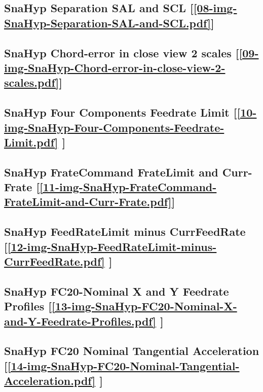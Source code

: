 \subsection       {SnaHyp Separation SAL and SCL
	[\ref      {08-img-SnaHyp-Separation-SAL-and-SCL.pdf}] }
\label{ssec-08-img-SnaHyp-Separation-SAL-and-SCL.pdf}

\subsection       {SnaHyp Chord-error in close view 2 scales
	[\ref      {09-img-SnaHyp-Chord-error-in-close-view-2-scales.pdf}] }
\label{ssec-09-img-SnaHyp-Chord-error-in-close-view-2-scales.pdf}

\subsection       {SnaHyp Four Components Feedrate Limit
	[\ref      {10-img-SnaHyp-Four-Components-Feedrate-Limit.pdf} ] }
\label{ssec-10-img-SnaHyp-Four-Components-Feedrate-Limit.pdf}

\subsection    {SnaHyp FrateCommand FrateLimit and Curr-Frate
	[\ref      {11-img-SnaHyp-FrateCommand-FrateLimit-and-Curr-Frate.pdf}] }
\label{ssec-11-img-SnaHyp-FrateCommand-FrateLimit-and-Curr-Frate.pdf}

\subsection     {SnaHyp FeedRateLimit minus CurrFeedRate
	[\ref      {12-img-SnaHyp-FeedRateLimit-minus-CurrFeedRate.pdf} ] }
\label{ssec-12-img-SnaHyp-FeedRateLimit-minus-CurrFeedRate.pdf}

\subsection     {SnaHyp FC20-Nominal X and Y Feedrate Profiles
	[\ref      {13-img-SnaHyp-FC20-Nominal-X-and-Y-Feedrate-Profiles.pdf} ] }
\label{ssec-13-img-SnaHyp-FC20-Nominal-X-and-Y-Feedrate-Profiles.pdf}

\subsection     {SnaHyp FC20 Nominal Tangential Acceleration
	[\ref      {14-img-SnaHyp-FC20-Nominal-Tangential-Acceleration.pdf} ] }
\label{ssec-14-img-SnaHyp-FC20-Nominal-Tangential-Acceleration.pdf}

